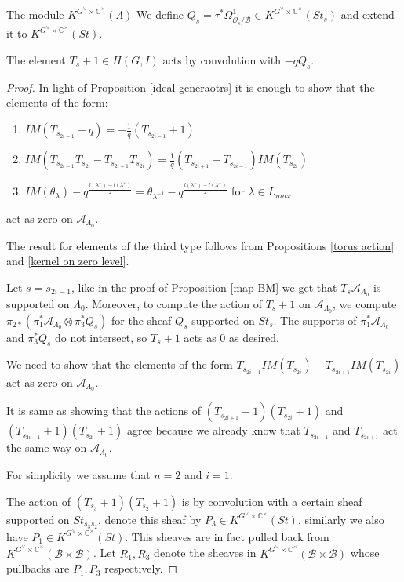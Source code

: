 \documentclass[12pt]{article}
\newcommand{\A}{\mathcal{A}}
\newcommand{\B}{\mathcal{B}}
\newcommand{\C}{\mathbb{C}}
\newcommand{\s}{\mathcal{O}}
\newcommand{\<}{\langle}
\renewcommand{\>}{\rangle}
\theoremstyle{plain}
\theoremstyle{definition}
\begin{document}
\begin{section}{The module $K^{G^\vee\times \C^\times}(\Lambda)$}
We define $Q_s=\tau^*\Omega^1_{\overline{\s_s}/\B}\in K^{G^\vee\times \C^\times}(St_s)$ and extend it to $K^{G^\vee\times \C^\times}(St)$. 

The element $T_s+1\in H(G,I)$ acts by convolution with $-qQ_s$. 

\begin{proof}
    In light of Proposition \ref{ideal generaotrs} it is enough to show that the elements of the form:

    \begin{enumerate}
        \item $IM(T_{s_{2i-1}}-q)=-\frac{1}{q}(T_{s_{2i-1}}+1)$
        \item $IM(T_{s_{2i-1}}T_{s_{2i}}-T_{s_{2i+1}}T_{s_{2i}})=\frac{1}{q}(T_{s_{2i+1}}-T_{s_{2i-1}})IM(T_{s_{2i}})$
        \item $IM(\theta_{\lambda})-q^\frac{l(\lambda^-)-l(\lambda^+)}{2}=\theta_{\lambda^{-1}}-q^\frac{l(\lambda^-)-l(\lambda^+)}{2}$ for $\lambda\in L_{max}$.
    \end{enumerate}

    act as zero on $\A_{\Lambda_0}$.


    The result for elements of the third type follows from Propositions \ref{torus action} and \ref{kernel on zero level}.

    Let $s=s_{2i-1}$, like in the proof of Proposition \ref{map BM} we get that $T_s\A_{\Lambda_0}$ is supported on $\Lambda_0$. Moreover, to compute the action of $T_s+1$ on $\A_{\Lambda_0}$, we compute  $\pi_{2*}(\pi^*_1\A_{\Lambda_0}\otimes \pi_3^*Q_s)$ for the sheaf $Q_s$ supported on $St_s$. The supports of $\pi^*_1\A_{\Lambda_0}$ and $\pi_3^*Q_s$ do not intersect, so  $T_s+1$ acts as $0$ as desired.
    

    We need to show that the elements of the form $T_{s_{2i-1}}IM(T_{s_{2i}})-T_{s_{2i+1}}IM(T_{s_{2i}})$ act as zero on $\A_{\Lambda_0}$. 
    
    It is same as showing that the actions of $(T_{s_{2i+1}}+1)(T_{s_{2i}}+1)$ and $(T_{s_{2i-1}}+1)(T_{s_{2i}}+1)$ agree because we already know that $T_{s_{2i-1}}$ and $T_{s_{2i+1}}$ act the same way on $\A_{\Lambda_0}$.

    


    
    For simplicity we assume that $n=2$ and $i=1$.

    The action of $(T_{s_{3}}+1)(T_{s_{2}}+1)$ is by convolution with a certain sheaf supported on $St_{s_{3}s_{2}}$, denote this sheaf by $P_3\in K^{G^\vee\times\C^\times}(St)$, similarly we also have $P_1\in K^{G^\vee\times\C^\times}(St)$. This sheaves are in fact pulled back from $K^{G^\vee\times\C^\times}(\B\times \B)$. Let $R_1,R_3$ denote the sheaves in $K^{G^\vee\times\C^\times}(\B\times \B)$ whose pullbacks are $P_1,P_3$ respectively.  


\end{proof}
\end{section}
\end{document}
